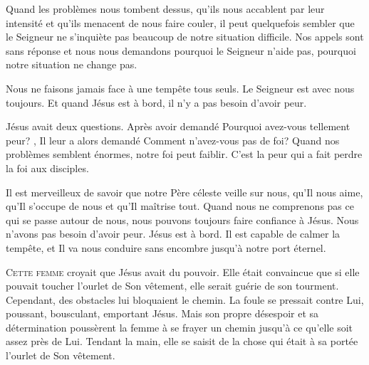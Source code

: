 Quand les problèmes nous tombent dessus, qu'ils nous accablent
 par leur intensité et qu'ils menacent de nous faire couler,
 il peut quelquefois sembler que le Seigneur ne s'inquiète pas beaucoup
 de notre situation difficile. Nos appels sont sans réponse
 et nous nous demandons pourquoi le Seigneur n'aide pas,
 pourquoi notre situation ne change pas.

Nous ne faisons jamais face à une tempête tous seuls.
 Le Seigneur est avec nous \ocadr toujours.
 Et quand Jésus est à bord, il n'y a pas besoin d'avoir peur.

Jésus avait deux questions. Après avoir demandé\frcolon{} 
 \Og Pourquoi avez-vous tellement peur? \Fg{}, Il leur a alors demandé\frcolon{} 
 \Og Comment n'avez-vous pas de foi? \Fg{}
 Quand nos problèmes semblent énormes, notre foi peut faiblir.
 C'est la peur qui a fait perdre la foi aux disciples.


Il est merveilleux de savoir que notre Père céleste veille sur nous,
 qu'Il nous aime, qu'Il s'occupe de nous et qu'Il maîtrise tout.
 Quand nous ne comprenons pas ce qui se passe autour de nous,
 nous pouvons toujours faire confiance à Jésus.
 Nous n'avons pas besoin d'avoir peur. Jésus est à bord.
 Il  est capable de calmer la tempête,
 et Il va nous conduire sans encombre jusqu'à notre port éternel.

\dvrule






\lettrine{C}{ette femme} croyait que Jésus avait du pouvoir.
 Elle était convaincue que si elle pouvait toucher l'ourlet de Son vêtement,
 elle serait guérie de son tourment. Cependant, des obstacles
 lui bloquaient le chemin. La foule se pressait contre Lui,
 poussant, bousculant, emportant Jésus.
 Mais son propre désespoir et sa détermination poussèrent la femme
 à se frayer un chemin jusqu'à ce qu'elle soit assez près de Lui.
 Tendant la main, elle se saisit de la chose qui était à sa portée
 \ocadr l'ourlet de Son vêtement.


